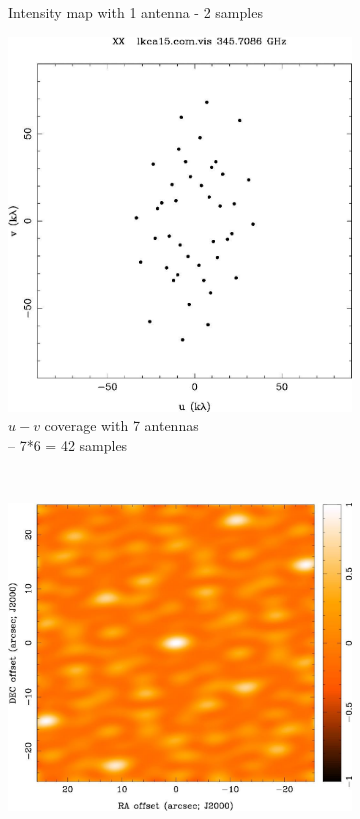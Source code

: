 \begin{figure}
\begin{subfigure}[b]{0.5\textwidth}
                \caption{Intensity map with 1 antenna - 2 samples}
                \label{fig:lm1ant}
        \end{subfigure} %
        \begin{subfigure}[b]{0.5\textwidth}
                \includegraphics[scale=0.4]{Figures/uv-coverage/7antcov}
                \caption{$u-v$ coverage with 7 antennas\\ -- 7*6 = 42 samples}
                \label{fig:uv7ant}
        \end{subfigure}%
        ~ %
        \begin{subfigure}[b]{0.5\textwidth}
                \includegraphics[scale=0.4]{Figures/uv-coverage/7antIma}

\end{subfigure}
\end{figure}

